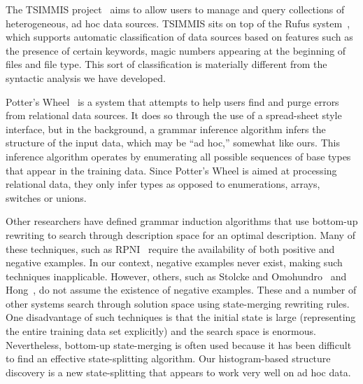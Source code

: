 The TSIMMIS project~\cite{chawathe+:tsimmis} aims to
allow users to manage and query collections of heterogeneous, ad hoc
data sources.  TSIMMIS sits on top of the Rufus
system~\cite{shoens+:rufus}, which supports automatic classification
of data sources based on features such as the presence of certain
keywords, magic numbers appearing at the beginning of files and file
type.  
This sort of classification is materially
different from the syntactic analysis we have developed.


Potter's Wheel~\cite{raman+:potterwheel} is a system that attempts to
help users find and purge errors from
relational data sources.  It does so through the use of a spread-sheet
style interface, but in the background, a grammar inference algorithm
infers the structure of the input data, which may be ``ad hoc,'' 
somewhat like ours.  This inference algorithm operates by
enumerating all possible sequences of base types that appear
in the training data.  
Since Potter's Wheel is aimed at processing
relational data, they only infer  types
as opposed to enumerations, arrays, switches or unions.  

Other researchers have defined grammar induction algorithms that use
bottom-up rewriting to search through description space for an optimal
description.  Many of these techniques, such as RPNI~\cite{rpni} 
require the availability of both
positive and negative examples.  In our context, negative examples
never exist, making such techniques inapplicable.
However, others, such as Stolcke and
Omohundro~\cite{stolcke94inducing} and Hong~\cite{hong01using}, do not
assume the existence of negative examples.  These and a number of other systems
search through solution space using
state-merging rewriting rules.  One disadvantage of such
techniques is that the initial state is large (representing
the entire training data set explicitly) and the search space is 
enormous.  Nevertheless, bottom-up state-merging is often used because
it has been difficult to find an effective state-splitting algorithm.
Our histogram-based structure discovery is a new state-splitting
that appears to work very well on ad hoc data.

